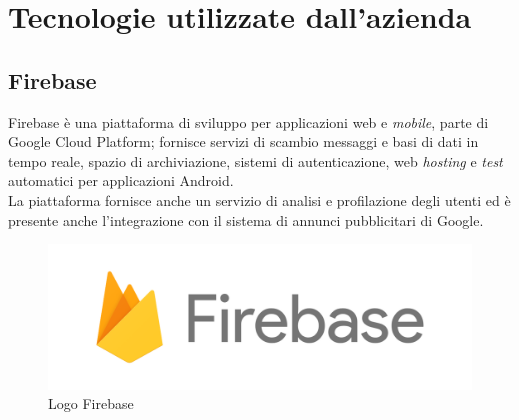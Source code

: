   \section{Tecnologie utilizzate dall'azienda}
    \subsection{Firebase}
      Firebase è una piattaforma di sviluppo per applicazioni web e \textit{mobile}, parte di Google Cloud Platform; fornisce servizi di scambio messaggi e basi di dati in tempo reale, spazio di archiviazione, sistemi di autenticazione, web \textit{hosting} e \textit{test} automatici per applicazioni Android.\\
      La piattaforma fornisce anche un servizio di analisi e profilazione degli utenti ed è presente anche l'integrazione con il sistema di annunci pubblicitari di Google.
      \begin{figure}[h]
        \centering
        \includegraphics[scale=0.2]{immagini/firebase.png}
        \caption{Logo Firebase}
        \label{logoFire}
      \end{figure}
